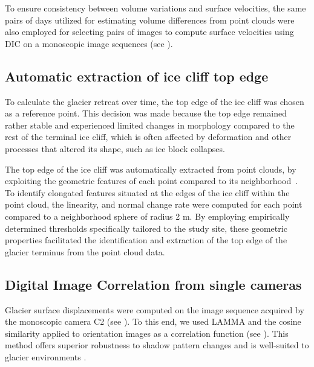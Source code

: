 To ensure consistency between volume variations and surface velocities, the same pairs of
days utilized for estimating volume differences from point clouds were also employed for
selecting pairs of images to compute surface velocities using DIC on a monoscopic image
sequences (see ).

\subsection{Automatic extraction of ice cliff top edge}
\label{sec:4:topedge}
To calculate the glacier retreat over time, the top edge of the ice cliff was chosen as a reference point.
This decision was made because the top edge remained rather stable and experienced
limited changes in morphology compared to the rest of the terminal ice cliff, which is often affected by deformation and other processes that altered its shape, such as ice block collapses.

The top edge of the ice cliff was automatically extracted from point clouds, by exploiting the geometric features of each point compared to its neighborhood~\citep{Hackel2016}.
To identify elongated features situated at the edges of the ice cliff within the point cloud, the linearity, and normal change rate were computed for each point compared to a neighborhood sphere of radius 2 m. By employing empirically determined thresholds
specifically tailored to the study site, these geometric properties facilitated the
identification and extraction of the top edge of the glacier terminus from the point
cloud data.

\subsection{Digital Image Correlation from single cameras}
\label{sec:4:dic}

Glacier surface displacements were computed on the image sequence acquired by the monoscopic camera C2 (see ).
To this end, we used LAMMA \citep{Dematteis2022} and the cosine similarity applied to orientation images as a correlation function (see ).
This method offers superior robustness to shadow pattern changes and is well-suited to glacier environments \citep{Heid2012_evaluation_xcorr}.


